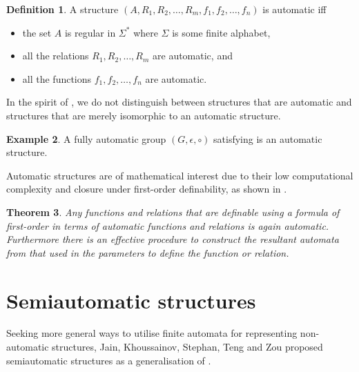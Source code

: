 \documentclass[british,a4paper,11pt,abstract=on]{scrreprt}
\newtheorem{theorem}{Theorem}
\theoremstyle{definition}
\newtheorem{definition}[theorem]{Definition}
\newtheorem{example}[theorem]{Example}
\theoremstyle{remark}
\begin{document}
\begin{definition} \label{automatic structure}
     A structure \((A, R_1, R_2, \dots, R_m, f_1, f_2,\dots, f_n)\) is automatic iff
    \begin{itemize}
        \item the set \(A\) is regular in \(\Sigma^*\) where \(\Sigma\) is some finite alphabet,
        \item all the relations \(R_1, R_2, \dots, R_m\) are automatic, and
        \item all the functions \(f_1, f_2, \dots, f_n\) are automatic.
    \end{itemize}
    In the spirit of ,
    we do not distinguish between structures that are automatic and structures that are merely isomorphic to an automatic structure.
\end{definition}

\begin{example}
    A fully automatic group \((G, \epsilon, \circ)\) satisfying  is an automatic structure.
\end{example}

Automatic structures are of mathematical interest due to their low computational complexity and closure under first-order definability,
as shown in \autocite{KN}.

\begin{theorem}
    Any functions and relations that are definable using a formula of first-order in terms of automatic functions and relations is again automatic.
    Furthermore there is an effective procedure to construct the resultant automata from that used in the parameters to define the function or relation.
\end{theorem}

\section{Semiautomatic structures}

Seeking more general ways to utilise finite automata for representing non-automatic structures,
Jain, Khoussainov, Stephan, Teng and Zou proposed semiautomatic structures as a generalisation of  \autocite{semiauto}.
\end{document}
